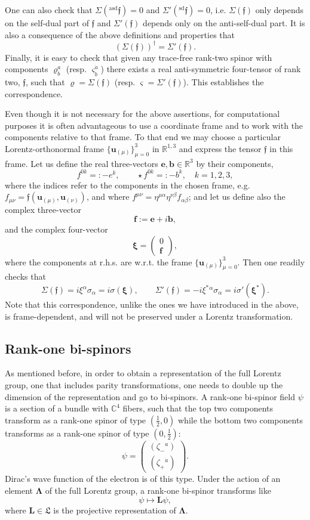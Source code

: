 \documentclass[11pt]{article}
\theoremstyle{definition}
\numberwithin{equation}{section}
\newcommand{\ff}{\mathfrak{f}}
\newcommand{\bb}{\mathbf{b}}
\newcommand{\be}{\mathbf{e}}
\newcommand{\beff}{\mathbf{f}}
\newcommand{\bff}{\boldsymbol{\ff}}
\newcommand{\bL}{\mathbf{L}}
\newcommand{\bu}{\mathbf{u}}
\newcommand{\beq}{\begin{equation}}
\newcommand{\eeq}{\end{equation}}
\newcommand{\fL}{\mathfrak{L}}
\newcommand{\xiV}{{\boldsymbol{\xi}}}
\newcommand{\bLa}{\boldsymbol{\Lambda}}
\newcommand{\Cset}{{\mathbb C}}
\newcommand{\Rset}{{\mathbb R}}
\newcommand{\al}{\alpha}
\newcommand{\si}{\sigma}
\newcommand{\Si}{\Sigma}
\newcommand{\half}{\frac{1}{2}}
\newcommand{\sdf}{{}^{\mathrm{sd}}\bff}
\newcommand{\asdf}{{}^{\mathrm{asd}}\bff}
\begin{document}
 One can also check that $\Si(\asdf) = 0$ and $\Si'(\sdf) = 0$, i.e. $\Si(\bff)$ only depends on the self-dual part of $\bff$ and 
$\Si'(\bff)$ depends only on the anti-self-dual part.  
It is also a consequence of the above definitions and properties that 
\beq 
\left( \Si(\bff)\right)^\dag = \Si'(\bff).
\eeq
 Finally, it is easy to 
check that given any trace-free rank-two spinor with components $\varrho^a_b$ (resp. $\varsigma^{\dot{a}}_{\dot{b}}$) there 
exists a real anti-symmetric four-tensor of rank two, $\bff$, such that $\varrho = \Si(\bff)$ (resp. $\varsigma = \Si'(\bff)$). 
 This establishes the correspondence.

 Even though it is not necessary for the above assertions, for computational purposes it is often advantageous to use a coordinate 
frame and to work with the components relative to that frame. 
 To that end we may choose a particular Lorentz-orthonormal frame $\{\bu_{(\mu)}\}_{\mu = 0}^3$ in $\Rset^{1,3}$ and express the tensor 
$\bff$ in this frame. 
 Let us define the real three-vectors $\be,\bb \in \Rset^3$ by their components,
\beq \label{defeb}
f^{0k} =: -e^k,\qquad \star{f}^{0k} =: -b^k,\quad k=1,2,3, 
\eeq
where the indices refer to the components in the chosen frame, e.g. $f_{\mu\nu} = \bff(\bu_{(\mu)},\bu_{(\nu)})$, and where
$f^{\mu\nu} = \eta^{\mu\al}\eta^{\nu\beta} f_{\al\beta}$; and let us define also the complex three-vector
\beq  
\beff := \be + i \bb, 
\eeq
and the complex four-vector
\beq 
\xiV = \begin{pmatrix} 0 \\  \beff \end{pmatrix},
\eeq
where the components at r.h.s. are w.r.t. the frame $\{\bu_{(\mu)}\}_{\mu = 0}^3$.
 Then one readily checks that
\beq 
\Si(\bff) = i\xi^\al\si_\al = i\si(\xiV),\qquad \Si'(\bff) = -i\xi^\ast{}^\al \si_\al=i\si'(\xiV^\ast).
\eeq
 Note that this correspondence, unlike the ones we have introduced in the above, is frame-dependent, and will not be preserved under a 
Lorentz transformation.



\subsection{Rank-one bi-spinors}

 As mentioned before, in order to obtain a representation of the full Lorentz group, one that includes parity transformations, 
one needs to double up the dimension of the representation and go to bi-spinors.  
A rank-one bi-spinor field $\psi$ is a section of a  bundle with $\Cset^4$ fibers, such that the top two components transform as a 
rank-one spinor of type $(\half,0)$ while the bottom two components transforms as a rank-one spinor of type $(0,\half)$:
\beq 
\psi = \left( \begin{array}{c} (\zeta_-{}^a) \\ (\zeta_+{}^{\dot{a}}) \end{array}\right).
\eeq
 Dirac's wave function of the electron is of this type. 
 Under the action of an element $\bLa$ of the full Lorentz group, a rank-one bi-spinor transforms like
\beq  
\psi \mapsto \bL \psi ,
\eeq
where $\bL \in \fL$ is the projective representation of $\bLa$.  
\end{document}
